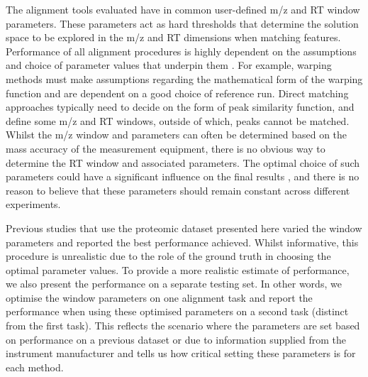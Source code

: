 The alignment tools evaluated have in common user-defined \ac{m/z} and \ac{RT} window parameters. These parameters act as hard thresholds that determine the solution space to be explored in the \ac{m/z} and \ac{RT} dimensions when matching features. Performance of all alignment procedures is highly dependent on the assumptions and choice of parameter values that underpin them \cite{Smith2013}. For example, warping methods must make assumptions regarding the mathematical form of the warping function and are dependent on a good choice of reference run. Direct matching approaches typically need to decide on the form of peak similarity function, and define some \ac{m/z} and \ac{RT} windows, outside of which, peaks cannot be matched. Whilst the \ac{m/z} window and parameters can often be determined based on the mass accuracy of the measurement equipment, there is no obvious way to determine the \ac{RT} window and associated parameters. The optimal choice of such parameters could have a significant influence on the final results \cite{Smith2013}, and there is no reason to believe that these parameters should remain constant across different experiments. 

Previous studies that use the proteomic dataset presented here \cite{Lange2008,Ballardini2011,Voss2011a} varied the window parameters and reported the best performance achieved. Whilst informative, this procedure is unrealistic due to the role of the ground truth in choosing the optimal parameter values. To provide a more realistic estimate of performance, we also present the performance on a separate testing set. In other words, we optimise the window parameters on one alignment task and report the performance when using these optimised parameters on a second task (distinct from the first task). This reflects the scenario where the parameters are set based on performance on a previous dataset or due to information supplied from the instrument manufacturer and tells us how critical setting these parameters is for each method. 

